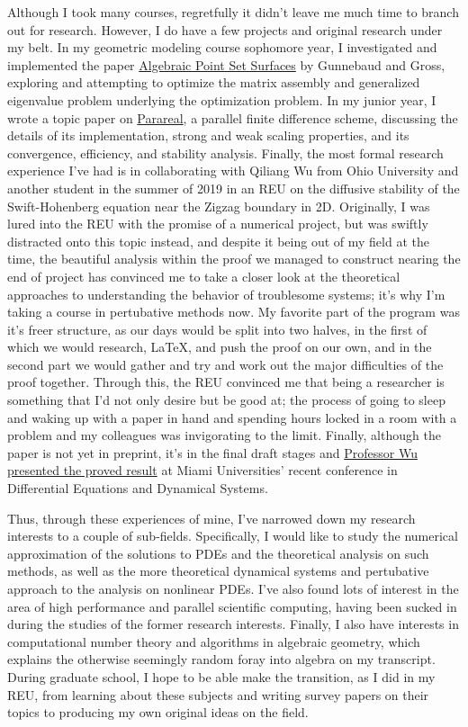 \documentclass{article}
\begin{document}
Although I took many courses, regretfully it didn't leave me much time to branch
out for research. However, I do have a few projects and original research under
my belt. In my geometric modeling course sophomore year, I investigated and
implemented the paper
\href{https://abhijit-c.github.io/storage/Guennebaud07.pdf}
{Algebraic Point Set Surfaces} 
by Gunnebaud and Gross, exploring and attempting to optimize the matrix assembly
and generalized eigenvalue problem underlying the optimization problem. In my
junior year, I wrote a topic paper on
\href{https://abhijit-c.github.io/Research/resources/Parareal/Parareal.pdf}
{Parareal},
a parallel finite difference scheme, discussing the details of its
implementation, strong and weak scaling properties, and its convergence,
efficiency, and stability analysis. Finally, the most formal research experience
I've had is in collaborating with Qiliang Wu from Ohio University and another
student in the summer of 2019 in an REU on the diffusive stability of the
Swift-Hohenberg equation near the Zigzag boundary in 2D. Originally, I was lured
into the REU with the promise of a numerical project, but was swiftly distracted
onto this topic instead, and despite it being out of my field at the time, the
beautiful analysis within the proof we managed to construct nearing the end of
project has convinced me to take a closer look at the theoretical approaches to
understanding the behavior of troublesome systems; it's why I'm taking a course
in pertubative methods now.  My favorite part of the program was it's freer
structure, as our days would be split into two halves, in the first of which we
would research, \LaTeX, and push the proof on our own, and in the second part we
would gather and try and work out the major difficulties of the proof together.
Through this, the REU convinced me that being a researcher is something that I'd
not only desire but be good at; the process of going to sleep and waking up with
a paper in hand and spending hours locked in a room with a problem and my
colleagues was invigorating to the limit. Finally, although the paper is not yet
in preprint, it's in the final draft stages and
\href{https://abhijit-c.github.io/Research/resources/SHE/slides.pdf}
{Professor Wu presented the proved result} 
at Miami Universities' recent conference in Differential Equations and Dynamical
Systems.

Thus, through these experiences of mine, I've narrowed down my research
interests to a couple of sub-fields. Specifically, I would like to study 
the numerical approximation of the solutions to PDEs and the theoretical
analysis on such methods, as well as the more theoretical dynamical systems and
pertubative approach to the analysis on nonlinear PDEs. I've also found lots of
interest in the area of high performance and parallel scientific computing,
having been sucked in during the studies of the former research interests.
Finally, I also have interests in computational number theory and algorithms in
algebraic geometry, which explains the otherwise seemingly random foray into
algebra on my transcript. During graduate school, I hope to be able make the
transition, as I did in my REU, from learning about these subjects and writing
survey papers on their topics to producing my own original ideas on the field.
\end{document}
